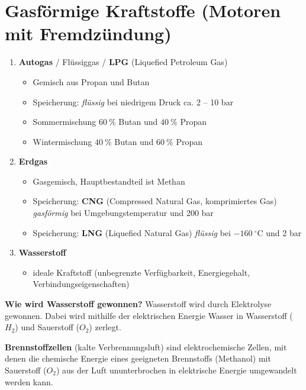 \section{Gasförmige Kraftstoffe (Motoren mit
Fremdzündung)}\label{gasfoermige-kraftstoffe-motoren-mit-fremdzuendung}

\begin{enumerate}
\item
  \textbf{Autogas} / Flüssiggas / \textbf{LPG} (Liquefied Petroleum Gas)

  \begin{itemize}
  \item
    Gemisch aus Propan und Butan
  \item
    Speicherung: \emph{flüssig} bei niedrigem Druck ca. 2 -- 10 bar
  \item
    Sommermischung $60~\%$ Butan und $40~\%$ Propan
  \item
    Wintermischung $40~\%$ Butan und $60~\%$ Propan
  \end{itemize}
\item
  \textbf{Erdgas}

  \begin{itemize}
  \item
    Gasgemisch, Hauptbestandteil ist Methan
  \item
    Speicherung: \textbf{CNG} (Compressed Natural Gas, komprimiertes
    Gas) \emph{gasförmig} bei Umgebungstemperatur und 200 bar
  \item
    Speicherung: \textbf{LNG} (Liquefied Natural Gas) \emph{flüssig} bei
    $- 160~^\circ\text{C}$ und 2 bar
  \end{itemize}
\item
  \textbf{Wasserstoff}

  \begin{itemize}
  \item
    ideale Kraftstoff (unbegrenzte Verfügbarkeit, Energiegehalt,
    Verbindungseigenschaften)
  \end{itemize}
\end{enumerate}

\textbf{Wie wird Wasserstoff gewonnen?} Wasserstoff wird durch
Elektrolyse gewonnen. Dabei wird mithilfe der elektrischen Energie
Wasser in Wasserstoff ($H_2$) und Sauerstoff ($O_2$) zerlegt.

\textbf{Brennstoffzellen} (kalte Verbrennungsluft) sind elektrochemische
Zellen, mit denen die chemische Energie eines geeigneten Brennstoffs
(Methanol) mit Sauerstoff ($O_2$) aus der Luft ununterbrochen in
elektrische Energie umgewandelt werden kann.

